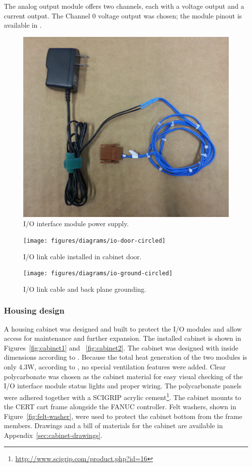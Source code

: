The analog output module offers two channels, each with a voltage output and a current output. The Channel 0 voltage output was chosen; the module pinout is available in \cite[sec~7.1.3]{io-unit}.

\begin{figure}
    \centering
    \includegraphics[width=.8\linewidth]{figures/io-power-splice}
    \caption{I/O interface module power supply.}
    \label{fig:io-power}
\end{figure}

\begin{figure}
    \centering
    \texttt{[image: figures/diagrams/io-door-circled]}
    \caption{I/O link cable installed in cabinet door.}
    \label{fig:io-door}
\end{figure}

\begin{figure}
    \centering
    \texttt{[image: figures/diagrams/io-ground-circled]}
    \caption{I/O link cable and back plane grounding.}
    \label{fig:io-ground}
\end{figure}

\subsubsection{Housing design}
A housing cabinet was designed and built to protect the I/O modules and allow access for maintenance and further expansion. The installed cabinet is shown in Figures~\ref{fig:cabinet1} and ~\ref{fig:cabinet2}. The cabinet was designed with inside dimensions according to \cite[sec~3.2]{io-unit}. Because the total heat generation of the two modules is only 4.3W, according to \cite[Table~3.3]{io-unit}, no special ventilation features were added. Clear polycarbonate was chosen as the cabinet material for easy visual checking of the I/O interface module status lights and proper wiring. The polycarbonate panels were adhered together with a SCIGRIP acrylic cement\footnote{\url{http://www.scigrip.com/product.php?id=16}}. The cabinet mounts to the CERT cart frame alongside the FANUC controller. Felt washers, shown in Figure~\ref{fig:felt-washer}, were used to protect the cabinet bottom from the frame members. Drawings and a bill of materials for the cabinet are available in Appendix~\ref{sec:cabinet-drawings}.

